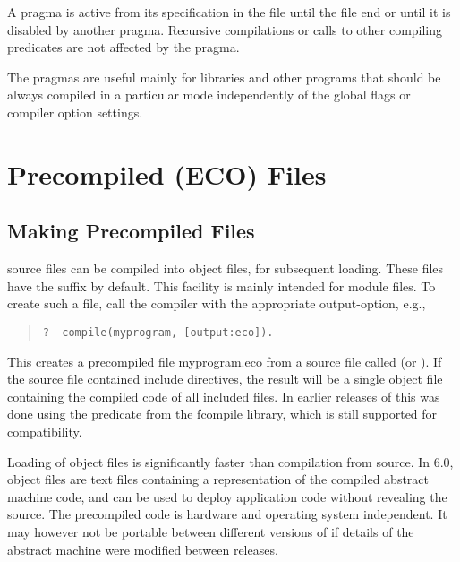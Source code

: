 A pragma is active from its specification in the file
until the file end or until it is disabled by another pragma.
Recursive compilations or calls to other compiling predicates
are not affected by the pragma.

The pragmas are  useful mainly for libraries and other programs
that should be always compiled in a particular mode
independently of the global flags or compiler option settings.


\section{Precompiled (ECO) Files}

\subsection{Making Precompiled Files}
{\eclipse} source files can be compiled into {\eclipse} object files,
for subsequent loading. These files have the  suffix
by default.
This facility is mainly intended for module files.
To create such a file, call the compiler with the
appropriate output-option, e.g.,
\begin{quote}
\begin{verbatim}
?- compile(myprogram, [output:eco]).
\end{verbatim}
\end{quote}
This creates a precompiled file myprogram.eco from a source file called
 (or ).  If the source file
contained
include directives, the result will be a single object file containing
the compiled code of all included files.
In earlier releases of {\eclipse} this was done using the
predicate from the fcompile library,
which is still supported for compatibility.

Loading of {\eclipse} object files is significantly faster than compilation
from source.  In {\eclipse} 6.0, {\eclipse} object files are text files
containing a representation of the compiled abstract machine code, and
can be used to deploy application code without revealing the source.
The precompiled code is hardware and operating system independent.
It may however not be portable between different versions of {\eclipse}
if details of the abstract machine were modified between releases.

